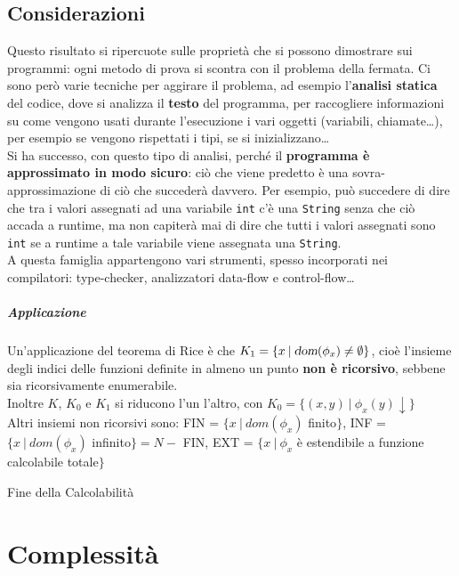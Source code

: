 \documentclass[10pt]{book}
\begin{document}
\section{Considerazioni}
Questo risultato si ripercuote sulle proprietà che si possono dimostrare sui programmi: ogni metodo di prova si scontra con il problema della fermata. Ci sono però varie tecniche per aggirare il problema, ad esempio l'\textbf{analisi statica} del codice, dove si analizza il \textbf{testo} del programma, per raccogliere informazioni su come vengono usati durante l'esecuzione i vari oggetti (variabili, chiamate\ldots), per esempio se vengono rispettati i tipi, se si inizializzano\ldots\\
Si ha successo, con questo tipo di analisi, perché il \textbf{programma è approssimato in modo sicuro}: ciò che viene predetto è una sovra-approssimazione di ciò che succederà davvero. Per esempio, può succedere di dire che tra i valori assegnati ad una variabile \texttt{int} c'è una \texttt{String} senza che ciò accada a runtime, ma non capiterà mai di dire che tutti i valori assegnati sono \texttt{int} se a runtime a tale variabile viene assegnata una \texttt{String}.\\
A questa famiglia appartengono vari strumenti, spesso incorporati nei compilatori: type-checker, analizzatori data-flow e control-flow\ldots
\paragraph{Applicazione} Un'applicazione del teorema di Rice è che $K_1 = \{x\: |\: \textsl{dom}(\phi_x) \neq \emptyset\}$, cioè l'insieme degli indici delle funzioni definite in almeno un punto \textbf{non è ricorsivo}, sebbene sia ricorsivamente enumerabile.\\
Inoltre $K$, $K_0$ e $K_1$ si riducono l'un l'altro, con $K_0 = \{(x,y)\:|\:\phi_x(y)\downarrow\}$\\
Altri insiemi non ricorsivi sono: FIN = $\{x\:|\:dom(\phi_x)$ finito$\}$, INF = $\{x\:|\:dom(\phi_x)$ infinito$\} = N -$ FIN, EXT = $\{x\:|\:\phi_x$ è estendibile a funzione calcolabile totale$\}$
\begin{center}
Fine della Calcolabilità
\end{center}
\chapter{Complessità}
\end{document}
